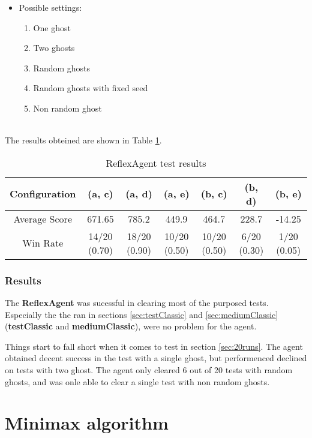 \documentclass{article}
\begin{document}
\begin{itemize}
  \item Possible settings:
  \begin{enumerate}[label=(\alph*)]
    \item One ghost
    \item Two ghosts
    \item Random ghosts
    \item Random ghosts with fixed seed
    \item Non random ghost
  \end{enumerate}
\end{itemize}

~\\
The results obteined are shown in Table \ref{tab:reflexagent}.

\begin{table}[!ht]
  \begin{center}
  \begin{tabular}{||c||c|c|c|c|c|c||}
  \hline
  Configuration & (a, c) & (a, d) & (a, e) & (b, c) & (b, d) & (b, e) \\
  \hline\hline
  Average Score & 671.65 & 785.2 & 449.9 & 464.7 & 228.7 & -14.25 \\
  \hline\hline
  Win Rate & 14/20 (0.70) & 18/20 (0.90) & 10/20 (0.50) & 10/20 (0.50) & 6/20 (0.30) & 1/20 (0.05) \\
  \hline
  \end{tabular}
  \caption{ReflexAgent test results}
  \label{tab:reflexagent}
  \end{center}
\end{table}

\subsubsection{Results}
The \textbf{ReflexAgent} was sucessful in clearing most of the purposed tests. Especially the the ran in sections \ref{sec:testClassic} and \ref{sec:mediumClassic} (\textbf{testClassic} and \textbf{mediumClassic}), were no problem for the agent.

Things start to fall short when it comes to test in section \ref{sec:20runs}. The agent obtained decent success in the test with a single ghost, but performenced declined on tests with two ghost. The agent only cleared 6 out of 20 tests with random ghosts, and was onle able to clear a single test with non random ghosts.

\hfill\break
\pagebreak
\section{Minimax algorithm}
\end{document}
